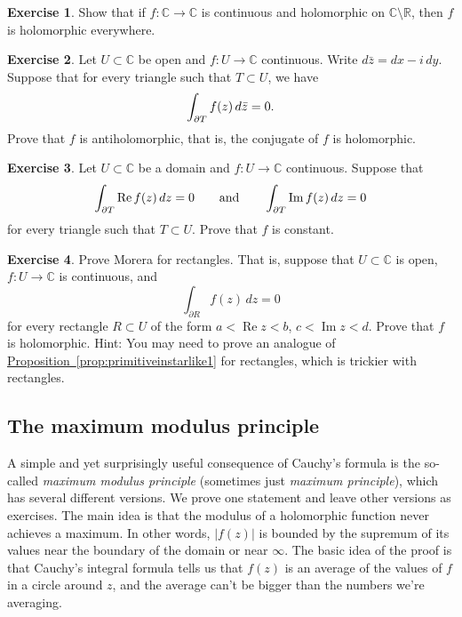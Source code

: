 \documentclass[12pt,openany]{book}
\newcommand{\avoidbreak}{\postdisplaypenalty=100}
\renewcommand{\Re}{\operatorname{Re}}
\renewcommand{\Im}{\operatorname{Im}}
\newcommand{\sabs}[1]{\lvert {#1} \rvert}
\newcommand{\C}{{\mathbb{C}}}
\newcommand{\R}{{\mathbb{R}}}
\theoremstyle{plain}
\theoremstyle{remark}
\theoremstyle{definition}
\newenvironment{exbox}{%
    \def\FrameCommand{\vrule width 1pt \relax\hspace{10pt}}%
    \MakeFramed{\advance\hsize-\width\FrameRestore}%
}{%
    \endMakeFramed
}
\theoremstyle{exercise}
\newtheorem{exercise}{Exercise}[section]
\theoremstyle{example}
\newcommand{\propref}[1]{\hyperref[#1]{Proposition~\ref*{#1}}}
\begin{document}
\begin{exbox}
\begin{exercise}
Show that if $f \colon \C \to \C$ is continuous and holomorphic on $\C
\setminus \R$, then $f$ is holomorphic everywhere.
\end{exercise}

\begin{exercise}
Let $U \subset \C$ be open and $f \colon U \to \C$ continuous.
Write $d\bar{z} = dx - i \, dy$.
Suppose that 
for every triangle such that $T \subset U$, we have
\begin{equation*}
\int_{\partial T} f(z) \, d\bar{z} = 0 .
\avoidbreak
\end{equation*}
Prove that $f$
is antiholomorphic, that is, the conjugate of $f$ is holomorphic.
\end{exercise}

\begin{exercise}
Let $U \subset \C$ be a domain and $f \colon U \to \C$ continuous.
Suppose that
\begin{equation*}
\int_{\partial T} \Re f(z) \, dz = 0
\qquad \text{and} \qquad
\int_{\partial T} \Im f(z) \, dz = 0
\avoidbreak
\end{equation*}
for every triangle such that $T \subset U$.  Prove that $f$ is constant.
\end{exercise}

\begin{exercise}
Prove Morera for rectangles.  That is, suppose that $U \subset \C$ is open,
$f \colon U \to \C$ is continuous,
and
\begin{equation*}
\int_{\partial R} f(z) \, dz = 0
\end{equation*}
for every rectangle $R \subset U$ of the form
$a < \Re z < b$, $c < \Im z < d$.  Prove that $f$ is holomorphic.
Hint:  You may need to prove an analogue of
\propref{prop:primitiveinstarlike1} for rectangles, which is trickier with
rectangles.
\end{exercise}
\end{exbox}

\subsection{The maximum modulus principle}

A simple and yet surprisingly useful consequence of Cauchy's formula is the
so-called \emph{maximum modulus principle}
(sometimes just \emph{maximum principle}),
which has several different versions.
We prove one statement and leave other versions as exercises.
The main idea is that the modulus of a holomorphic function never
achieves a maximum.  In other words, $\sabs{f(z)}$ is bounded
by the supremum of its values near the boundary of the domain or near
$\infty$.
The basic idea of the proof is that Cauchy's integral formula tells us that
$f(z)$ is an average of the values of $f$ in a circle around $z$, and the
average can't be bigger than the numbers we're averaging.
\end{document}
